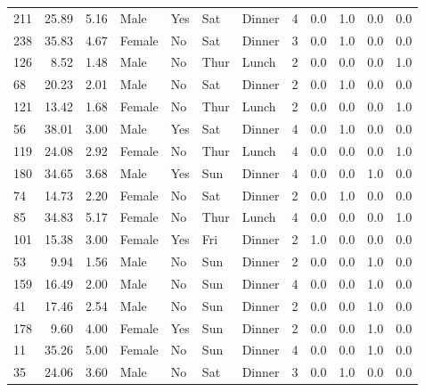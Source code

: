 \documentclass[
  letterpaper,
  DIV=11,
  numbers=noendperiod]{scrreprt}
\begin{document}
\begin{tabular}{lrrllllrrrrr}
211 &       25.89 &  5.16 &    Male &    Yes &   Sat &  Dinner &     4 &     0.0 &     1.0 &     0.0 &      0.0 \\
238 &       35.83 &  4.67 &  Female &     No &   Sat &  Dinner &     3 &     0.0 &     1.0 &     0.0 &      0.0 \\
126 &        8.52 &  1.48 &    Male &     No &  Thur &   Lunch &     2 &     0.0 &     0.0 &     0.0 &      1.0 \\
68  &       20.23 &  2.01 &    Male &     No &   Sat &  Dinner &     2 &     0.0 &     1.0 &     0.0 &      0.0 \\
121 &       13.42 &  1.68 &  Female &     No &  Thur &   Lunch &     2 &     0.0 &     0.0 &     0.0 &      1.0 \\
56  &       38.01 &  3.00 &    Male &    Yes &   Sat &  Dinner &     4 &     0.0 &     1.0 &     0.0 &      0.0 \\
119 &       24.08 &  2.92 &  Female &     No &  Thur &   Lunch &     4 &     0.0 &     0.0 &     0.0 &      1.0 \\
180 &       34.65 &  3.68 &    Male &    Yes &   Sun &  Dinner &     4 &     0.0 &     0.0 &     1.0 &      0.0 \\
74  &       14.73 &  2.20 &  Female &     No &   Sat &  Dinner &     2 &     0.0 &     1.0 &     0.0 &      0.0 \\
85  &       34.83 &  5.17 &  Female &     No &  Thur &   Lunch &     4 &     0.0 &     0.0 &     0.0 &      1.0 \\
101 &       15.38 &  3.00 &  Female &    Yes &   Fri &  Dinner &     2 &     1.0 &     0.0 &     0.0 &      0.0 \\
53  &        9.94 &  1.56 &    Male &     No &   Sun &  Dinner &     2 &     0.0 &     0.0 &     1.0 &      0.0 \\
159 &       16.49 &  2.00 &    Male &     No &   Sun &  Dinner &     4 &     0.0 &     0.0 &     1.0 &      0.0 \\
41  &       17.46 &  2.54 &    Male &     No &   Sun &  Dinner &     2 &     0.0 &     0.0 &     1.0 &      0.0 \\
178 &        9.60 &  4.00 &  Female &    Yes &   Sun &  Dinner &     2 &     0.0 &     0.0 &     1.0 &      0.0 \\
11  &       35.26 &  5.00 &  Female &     No &   Sun &  Dinner &     4 &     0.0 &     0.0 &     1.0 &      0.0 \\
35  &       24.06 &  3.60 &    Male &     No &   Sat &  Dinner &     3 &     0.0 &     1.0 &     0.0 &      0.0 \\

\end{tabular}
\end{document}

